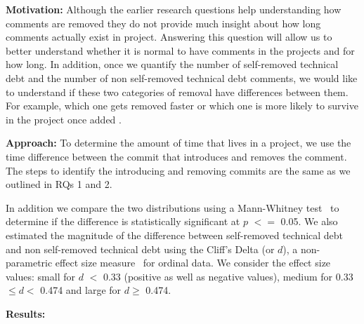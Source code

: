 \noindent\rqiii

\noindent \textbf{Motivation:} Although the earlier research questions help understanding how \SATD comments are removed they do not provide much insight about how long \SATD comments actually exist in project. Answering this question will allow us to better understand whether it is normal to have \SATD comments in the projects and for how long. In addition, once we quantify the number of self-removed technical debt and the number of non self-removed technical debt comments, we would like to understand if these two categories of removal have differences between them. For example, which one gets removed faster or which one is more likely to survive in the project once added . 

\noindent \textbf{Approach:} To determine the amount of time that \SATD lives in a project, we use the time difference between the commit that introduces and removes the \SATD comment. The steps to identify the \SATD introducing and removing commits are the same as we outlined in RQs 1 and 2.



In addition we compare the two distributions using a Mann-Whitney test~\cite{}  to determine if the difference is statistically significant at $p$ $<$$=$ 0.05. We also estimated the magnitude of the difference between self-removed technical debt and non self-removed technical debt using the Cliff's Delta (or $d$), a
non-parametric effect size measure~\cite{}  for ordinal data. We consider the effect size values: small for $d$ $<$ 0.33 (positive as well as negative values), medium for 0.33  $\leq d<$ 0.474 and large for $d \geq$ 0.474.



\noindent \textbf{Results:} 

